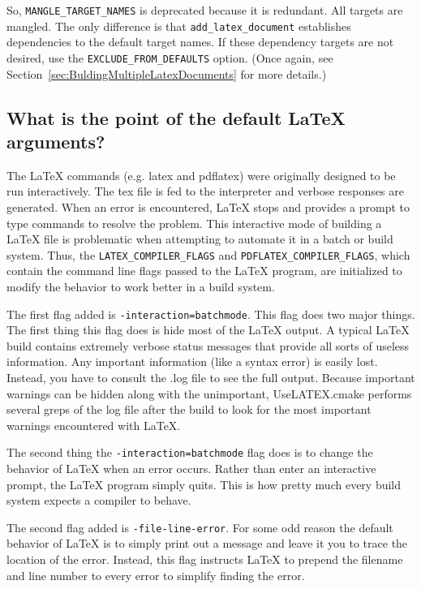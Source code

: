 \documentclass{article}
\newcommand*{\textfile}[1]{\textsf{#1}}
\newcommand*{\textprog}[1]{\textfile{#1}}
\newcommand*{\textcmake}[1]{\texttt{#1}}
\newcommand*{\textcmakevar}[1]{\textcmake{#1}}
\newcommand*{\UseLATEX}{\textfile{UseLATEX.cmake}\xspace}
\newcommand*{\latex}{\LaTeX\xspace}
\newcommand*{\ald}{\textcmake{add\_latex\_document}\xspace}
\begin{document}
  So, \textcmake{MANGLE\_TARGET\_NAMES} is deprecated because it is
  redundant. All targets are mangled. The only difference is that \ald
  establishes dependencies to the default target names. If these dependency
  targets are not desired, use the \textcmake{EXCLUDE\_FROM\_DEFAULTS}
  option. (Once again, see Section~\ref{sec:BuldingMultipleLatexDocuments}
  for more details.)

  \subsection{What is the point of the default \latex arguments?}
  \label{sec:What_is_the_point_of_the_default_latex_arguments}

  The \latex commands (e.g. \textprog{latex} and \textprog{pdflatex}) were originally designed to be run interactively.
  The \textfile{tex} file is fed to the interpreter and verbose responses are generated.
  When an error is encountered, \latex stops and provides a prompt to type commands to resolve the problem.
  This interactive mode of building a \latex file is problematic when attempting to automate it in a batch or build system.
  Thus, the \textcmakevar{LATEX\_COMPILER\_FLAGS} and \textcmakevar{PDFLATEX\_COMPILER\_FLAGS}, which contain the command line flags passed to the \latex program, are initialized to modify the behavior to work better in a build system.

  The first flag added is \mbox{\textcmake{-interaction=batchmode}}.
  This flag does two major things.
  The first thing this flag does is hide most of the \latex output.
  A typical \latex build contains extremely verbose status messages that provide all sorts of useless information.
  Any important information (like a syntax error) is easily lost.
  Instead, you have to consult the \textfile{.log} file to see the full output.
  Because important warnings can be hidden along with the unimportant, \UseLATEX performs several greps of the log file after the build to look for the most important warnings encountered with \latex.

  The second thing the \mbox{\textcmake{-interaction=batchmode}} flag does is to change the behavior of \latex when an error occurs.
  Rather than enter an interactive prompt, the \latex program simply quits.
  This is how pretty much every build system expects a compiler to behave.

  The second flag added is \mbox{\textcmake{-file-line-error}}.
  For some odd reason the default behavior of \latex is to simply print out a message and leave it you to trace the location of the error.
  Instead, this flag instructs \latex to prepend the filename and line number to every error to simplify finding the error.
\end{document}
